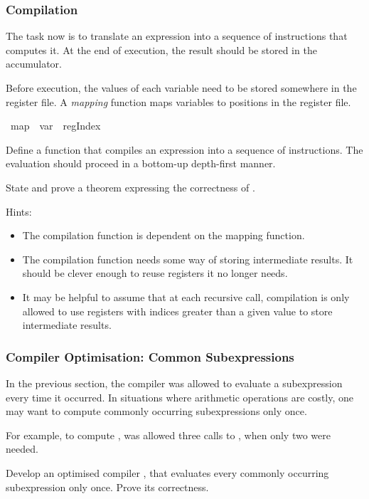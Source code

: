 \begin{isabellebody}
\begin{isamarkuptext}
\subsubsection*{Compilation}%
\end{isamarkuptext}%
\isamarkuptrue%
%
\begin{isamarkuptext}%
The task now is to translate an expression into a sequence of instructions that computes it. At the end of execution, the result should be stored in the accumulator.

Before execution, the values of each variable need to be stored somewhere in the register file. A {\it mapping} function maps variables to positions in the register file.%
\end{isamarkuptext}%
\isamarkuptrue%
\ map\ {\isacharequal}\ {\isachardoublequote}var\ {\isasymRightarrow}\ regIndex{\isachardoublequote}\isamarkupfalse%
%
\begin{isamarkuptext}%
Define a function  that compiles an expression into a sequence of instructions. The evaluation should proceed in a bottom-up depth-first manner.

State and prove a theorem expressing the correctness of .

Hints:
\begin{itemize}
  \item The compilation function is dependent on the mapping function.
  \item The compilation function needs some way of storing intermediate results. It should be clever enough to reuse registers it no longer needs.
  \item It may be helpful to assume that at each recursive call, compilation is only allowed to use registers with indices greater than a given value to store intermediate results.
\end{itemize}%
\end{isamarkuptext}%
\isamarkuptrue%
%
\begin{isamarkuptext}%
\subsubsection*{Compiler Optimisation: Common Subexpressions}%
\end{isamarkuptext}%
\isamarkuptrue%
%
\begin{isamarkuptext}%
In the previous section, the compiler  was allowed to evaluate a subexpression every time it occurred. In situations where arithmetic operations are costly, one may want to compute commonly occurring subexpressions only once.

For example, to compute ,  was allowed three calls to , when only two were needed.

Develop an optimised compiler , that evaluates every commonly occurring subexpression only once. Prove its correctness.%
\end{isamarkuptext}%
\isamarkuptrue%
\isamarkupfalse%
\end{isabellebody}%

